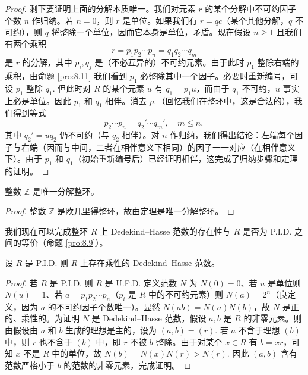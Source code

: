 \begin{proof}
剩下要证明上面的分解本质唯一。我们对元素 \(r\) 的某个分解中不可约因子个数 \(n\) 作归纳。若 \(n = 0\)，则 \(r\) 是单位。如果我们有 \(r = qc\)（某个其他分解，\(q\) 不可约），则 \(q\) 将整除一个单位，因而它本身是单位，矛盾。现在假设 \(n \geq 1\) 且我们有两个乘积
\[
r = p_1p_2\cdots p_n = q_1q_2\cdots q_m
\]
是 \(r\) 的分解，其中 \(p_i, q_j\) 是（不必互异的）不可约元素。由于此时 \(p_1\) 整除右端的乘积，由命题 \ref{pro:8.11} 我们看到 \(p_1\) 必整除其中一个因子。必要时重新编号，可设 \(p_1\) 整除 \(q_1\). 但此时对 \(R\) 的某个元素 \(u\) 有 \(q_1 = p_1u\)，而由于 \(q_1\) 不可约，\(u\) 事实上必是单位。因此 \(p_1\) 和 \(q_1\) 相伴。消去 \(p_1\)（回忆我们在整环中，这是合法的），我们得到等式
\[
p_2\cdots p_n = q_2'\cdots q_m', \quad m \leq n,
\]
其中 \(q_2' = uq_2\) 仍不可约（与 \(q_2\) 相伴）。对 \(n\) 作归纳，我们得出结论：左端每个因子与右端（因而与中间，二者在相伴意义下相同）的因子一一对应（在相伴意义下）。由于 \(p_1\) 和 \(q_1\)（初始重新编号后）已经证明相伴，这完成了归纳步骤和定理的证明。
\end{proof}

\begin{corollary}[算术基本定理]\label{cor:8.15}
整数 \(\mathbb{Z}\) 是唯一分解整环。
\end{corollary}

\begin{proof}
整数 \(\mathbb{Z}\) 是欧几里得整环，故由定理是唯一分解整环。
\end{proof}

我们现在可以完成整环 \(R\) 上 Dedekind--Hasse 范数的存在性与 \(R\) 是否为 P.I.D. 之间的等价（命题 \ref{pro:8.9}）。

\begin{corollary}\label{cor:8.16}
设 \(R\) 是 P.I.D. 则 \(R\) 上存在乘性的 Dedekind--Hasse 范数。
\end{corollary}

\begin{proof}
若 \(R\) 是 P.I.D. 则 \(R\) 是 U.F.D. 定义范数 \(N\) 为 \(N(0) = 0\)、若 \(u\) 是单位则 \(N(u) = 1\)、若 \(a = p_1p_2\cdots p_n\)（\(p_i\) 是 \(R\) 中的不可约元素）则 \(N(a) = 2^n\)（良定义，因为 \(a\) 的不可约因子个数唯一）。显然 \(N(ab) = N(a)N(b)\)，故 \(N\) 是正的、乘性的。为证明 \(N\) 是 Dedekind--Hasse 范数，假设 \(a, b\) 是 \(R\) 的非零元素。则由假设由 \(a\) 和 \(b\) 生成的理想是主的，设为 \((a, b) = (r)\). 若 \(a\) 不含于理想 \((b)\) 中，则 \(r\) 也不含于 \((b)\) 中，即 \(r\) 不被 \(b\) 整除。由于对某个 \(x \in R\) 有 \(b = xr\)，可知 \(x\) 不是 \(R\) 中的单位，故 \(N(b) = N(x)N(r) > N(r)\). 因此 \((a, b)\) 含有范数严格小于 \(b\) 的范数的非零元素，完成证明。
\end{proof}

